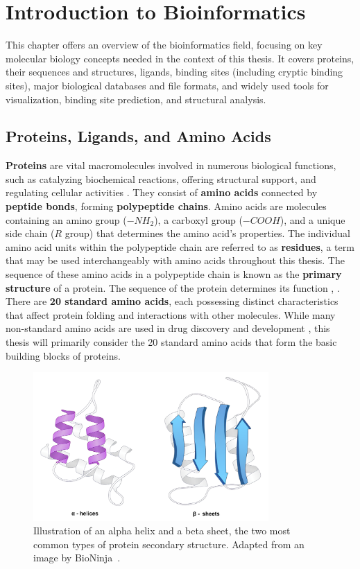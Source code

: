 \chapter{Introduction to Bioinformatics}
\label{chap:intro}

This chapter offers an overview of the bioinformatics field, focusing on key molecular biology concepts needed in the context of this thesis. It covers proteins, their sequences and structures, ligands, binding sites (including cryptic binding sites), major biological databases and file formats, and widely used tools for visualization, binding site prediction, and structural analysis.

\section{Proteins, Ligands, and Amino Acids}
\label{sec:proteins}

\textbf{Proteins} are vital macromolecules involved in numerous biological functions, such as catalyzing biochemical reactions, offering structural support, and regulating cellular activities \cite{cooper2022cell}. They consist of \textbf{amino acids} connected by \textbf{peptide bonds}, forming \textbf{polypeptide chains}. Amino acids are molecules containing an amino group (\(-NH_2\)), a carboxyl group (\(-COOH\)), and a unique side chain (\(R\) group) that determines the amino acid's properties. The individual amino acid units within the polypeptide chain are referred to as \textbf{residues}, a term that may be used interchangeably with amino acids throughout this thesis. The sequence of these amino acids in a polypeptide chain is known as the \textbf{primary structure} of a protein. The sequence of the protein determines its function \cite{nelson2008lehninger}, \cite{voet2010biochemistry}. There are \textbf{20 standard amino acids}, each possessing distinct characteristics that affect protein folding and interactions with other molecules. While many non-standard amino acids are used in drug discovery and development \cite{dumas2015designing}, this thesis will primarily consider the 20 standard amino acids that form the basic building blocks of proteins.

\begin{figure}[ht]
    \centering
    \includegraphics[width=0.8\textwidth]{img/ah_bs.png}
    \caption{Illustration of an alpha helix and a beta sheet, the two most common types of protein secondary structure. Adapted from an image by BioNinja~\cite{alphabetapicture}.}
    \label{fig:alpha-beta}
\end{figure}

